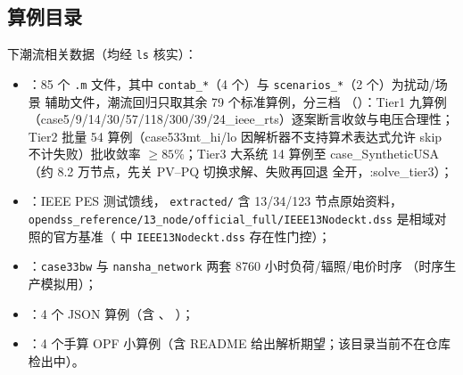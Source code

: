 \subsection{算例目录}\label{subsec:val-cases}
 下潮流相关数据（均经 \texttt{ls} 核实）：
\begin{itemize}
  \item \textbf{}：85 个 \texttt{.m} 文件，其中
        \texttt{contab\_*}（4 个）与 \texttt{scenarios\_*}（2 个）为扰动/场景
        辅助文件，潮流回归只取其余 79 个标准算例，分三档
        （）：Tier1 九算例
        （case5/9/14/30/57/118/300/39/24\_ieee\_rts）逐案断言收敛与电压合理性；
        Tier2 批量 54 算例（case533mt\_hi/lo 因解析器不支持算术表达式允许
        skip 不计失败）批收敛率 $\ge 85\%$；Tier3 大系统 14 算例至
        case\_SyntheticUSA（约 8.2 万节点，先关 PV--PQ 切换求解、失败再回退
        全开，:solve\_tier3）；
  \item \textbf{}：IEEE PES 测试馈线，
        \texttt{extracted/} 含 13/34/123 节点原始资料，
        \texttt{opendss\_reference/13\_node/official\_full/IEEE13Nodeckt.dss}
        是相域对照的官方基准（ 中
        \texttt{IEEE13Nodeckt.dss} 存在性门控）；
  \item \textbf{}：\texttt{case33bw} 与
        \texttt{nansha\_network} 两套 8760 小时负荷/辐照/电价时序
        （时序生产模拟用）；
  \item \textbf{}：4 个 JSON 算例（含
        、
        ）；
  \item \textbf{}：4 个手算 OPF 小算例（含 README
        给出解析期望；该目录当前不在仓库检出中）。
\end{itemize}

